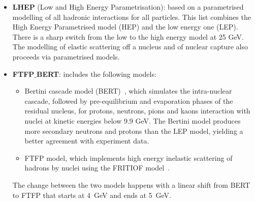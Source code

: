 \begin{itemize}
\item {\bf LHEP} (Low and High Energy Parametrisation): based on a parametrised modelling of all hadronic 
interactions for all particles. This list combines the High Energy Parametrised model (HEP) and the low energy 
one (LEP). There is a sharp switch from the low to the high energy model at 25 GeV. The modelling of elastic 
scattering off a nucleus and of nuclear capture also proceeds via parametrised models.
%
\item { \bf FTFP$\_$BERT}: includes the following models:
%
\begin{itemize}
%
\item Bertini cascade model (BERT)~\cite{Bertini:1963zzc}, which simulates the intra-nuclear cascade, followed by pre-equilibrium 
and evaporation phases of the residual nucleus, for protons, neutrons, pions and kaons interaction with 
nuclei at kinetic energies below 9.9 GeV. The Bertini model produces more secondary neutrons and protons
than the LEP model, yielding a better agreement with experiment data.
\item FTFP model, which implements high energy inelastic scattering of hadrons by nuclei using
the FRITIOF model~\cite{Andersson:1992iq}.
%
\end{itemize}
%
The change between the two models happens with a linear shift from BERT to FTFP that starts at 4~GeV and ends at 5~GeV.
%
\end{itemize}

